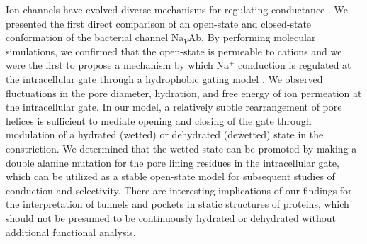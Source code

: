 \begin{refsection}


Ion channels have evolved diverse mechanisms for regulating conductance \cite{GoldschenOhm:2017hx}. We presented the first direct comparison of an open-state and closed-state conformation of the bacterial channel Na$_V$Ab. By performing molecular simulations, we confirmed that the open-state is permeable to cations and we were the first to propose a mechanism by which Na$^+$ conduction is regulated at the intracellular gate through a hydrophobic gating model \cite{Aryal:2015ge}. We observed fluctuations in the pore diameter, hydration, and free energy of ion permeation at the intracellular gate. In our model, a relatively subtle rearrangement of pore helices is sufficient to mediate opening and closing of the gate through modulation of a hydrated (wetted) or dehydrated (dewetted) state in the constriction. We determined that the wetted state can be promoted by making a double alanine mutation for the pore lining residues in the intracellular gate, which can be utilized as a stable open-state model for subsequent studies of conduction and selectivity. There are interesting implications of our findings for the interpretation of tunnels and pockets in static structures of proteins, which should not be presumed to be continuously hydrated or dehydrated without additional functional analysis.


\end{refsection}
